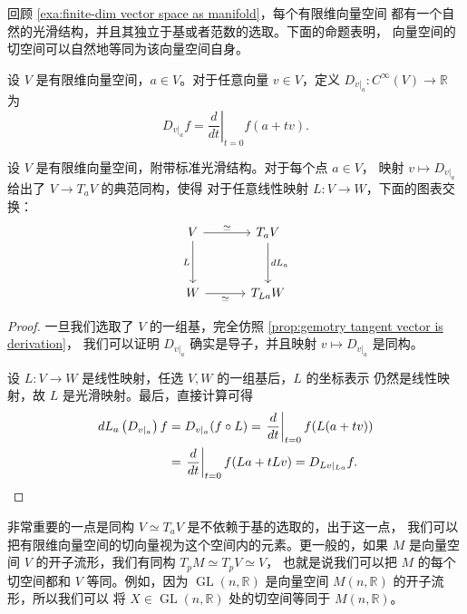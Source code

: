 \documentclass[fontset=none]{Notes}
\DeclareMathOperator\GL{GL}
\begin{document}
回顾 \autoref{exa:finite-dim vector space as manifold}，每个有限维向量空间
都有一个自然的光滑结构，并且其独立于基或者范数的选取。下面的命题表明，
向量空间的切空间可以自然地等同为该向量空间自身。

设 $V$ 是有限维向量空间，$a\in V$。对于任意向量 $v\in V$，定义
$D_{v|_a}:C^\infty(V)\to\mathbb{R}$ 为
\[
  D_{v|_a}f=\left.\frac{d}{dt}\right|_{t=0}f(a+tv).
\]

\begin{proposition}[向量空间的切空间]
  设 $V$ 是有限维向量空间，附带标准光滑结构。对于每个点 $a\in V$，
  映射 $v\mapsto D_{v|_a}$ 给出了 $V\to T_aV$ 的典范同构，使得
  对于任意线性映射 $L:V\to W$，下面的图表交换：
  \[
    \begin{tikzcd}[sep=3.2em]
      V\arrow[r,"\simeq"]\arrow[d,"L"'] & T_aV\arrow[d,"dL_a"] \\
      W\arrow[r,"\simeq"'] & T_{La}W
    \end{tikzcd}
  \]
\end{proposition}
\begin{proof}
  一旦我们选取了 $V$ 的一组基，完全仿照 \autoref{prop:gemotry tangent vector is derivation}，
  我们可以证明 $D_{v|_a}$ 确实是导子，并且映射 $v\mapsto D_{v|_a}$ 是同构。

  设 $L:V\to W$ 是线性映射，任选 $V,W$ 的一组基后，$L$ 的坐标表示
  仍然是线性映射，故 $L$ 是光滑映射。最后，直接计算可得
  \begin{align*}
    dL_a\left(D_{v|_a}\right)f&=D_{v|_a}(f\circ L)=\left.\frac{d}{dt}\right|_{t=0}
    f(L(a+tv))\\
    &=\left.\frac{d}{dt}\right|_{t=0}f(La+tLv)=D_{Lv|_{La}}f.\qedhere
  \end{align*}
\end{proof}

非常重要的一点是同构 $V\simeq T_aV$ 是不依赖于基的选取的，出于这一点，
我们可以把有限维向量空间的切向量视为这个空间内的元素。更一般的，如果 $M$
是向量空间 $V$ 的开子流形，我们有同构 $T_pM\simeq T_pV\simeq V$，
也就是说我们可以把 $M$ 的每个切空间都和 $V$ 等同。例如，因为
$\GL(n,\mathbb{R})$ 是向量空间 $M(n,\mathbb{R})$ 的开子流形，所以我们可以
将 $X\in\GL(n,\mathbb{R})$ 处的切空间等同于 $M(n,\mathbb{R})$。
\end{document}

